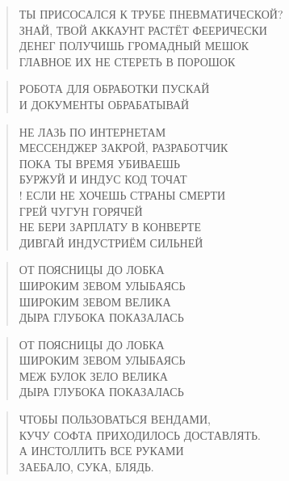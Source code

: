 \poemtitle{***}
\begin{verse}
ТЫ ПРИСОСАЛСЯ К ТРУБЕ ПНЕВМАТИЧЕСКОЙ?\\
ЗНАЙ, ТВОЙ АККАУНТ РАСТЁТ ФЕЕРИЧЕСКИ\\
ДЕНЕГ ПОЛУЧИШЬ ГРОМАДНЫЙ МЕШОК\\
ГЛАВНОЕ ИХ НЕ СТЕРЕТЬ В ПОРОШОК
\end{verse}

\poemtitle{***}
\begin{verse}
РОБОТА ДЛЯ ОБРАБОТКИ ПУСКАЙ\\
И ДОКУМЕНТЫ ОБРАБАТЫВАЙ
\end{verse}

\poemtitle{***}
\begin{verse}
НЕ ЛАЗЬ ПО ИНТЕРНЕТАМ\\
    МЕССЕНДЖЕР ЗАКРОЙ, РАЗРАБОТЧИК\\
ПОКА ТЫ ВРЕМЯ УБИВАЕШЬ\\
    БУРЖУЙ И ИНДУС КОД ТОЧАТ\\!
ЕСЛИ НЕ ХОЧЕШЬ СТРАНЫ СМЕРТИ\\
    ГРЕЙ ЧУГУН ГОРЯЧЕЙ\\
НЕ БЕРИ ЗАРПЛАТУ В КОНВЕРТЕ\\
    ДИВГАЙ ИНДУСТРИЁМ СИЛЬНЕЙ
\end{verse}

\poemtitle{***}
\begin{verse}
ОТ ПОЯСНИЦЫ ДО ЛОБКА\\
    ШИРОКИМ ЗЕВОМ УЛЫБАЯСЬ\\
ШИРОКИМ ЗЕВОМ ВЕЛИКА\\
    ДЫРА ГЛУБОКА ПОКАЗАЛАСЬ
\end{verse}

\poemtitle{***}
\begin{verse}
ОТ ПОЯСНИЦЫ ДО ЛОБКА\\
    ШИРОКИМ ЗЕВОМ УЛЫБАЯСЬ\\
МЕЖ БУЛОК ЗЕЛО ВЕЛИКА\\
    ДЫРА ГЛУБОКА ПОКАЗАЛАСЬ
\end{verse}

\poemtitle{***}
\begin{verse}
ЧТОБЫ ПОЛЬЗОВАТЬСЯ ВЕНДАМИ,\\
КУЧУ СОФТА ПРИХОДИЛОСЬ ДОСТАВЛЯТЬ.\\
А ИНСТОЛЛИТЬ ВСЕ РУКАМИ\\
ЗАЕБАЛО, СУКА, БЛЯДЬ.
\end{verse}

